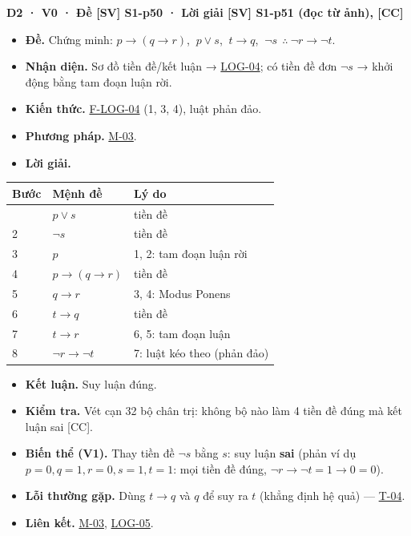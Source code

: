 \documentclass[
  10pt,
  twoside,openany]{book}
\providecommand{\tightlist}{%
  \setlength{\itemsep}{0pt}\setlength{\parskip}{0pt}}
\begin{document}
\textbf{D2 · V0 · Đề {[}SV{]} S1-p50 · Lời giải {[}SV{]} S1-p51 (đọc từ
ảnh), {[}CC{]}}

\begin{itemize}
\tightlist
\item
  \textbf{Đề.} Chứng minh: \(p\to(q\to r)\), \(\ p\vee s\),
  \(\ t\to q\), \(\ \neg s\ \ \therefore\ \neg r\to\neg t\).
\item
  \textbf{Nhận diện.} Sơ đồ tiền đề/kết luận →
  \protect\hyperlink{LOG-04}{LOG-04}; có tiền đề đơn \(\neg s\) → khởi
  động bằng tam đoạn luận rời.
\item
  \textbf{Kiến thức.} \protect\hyperlink{F-LOG-04}{F-LOG-04} (1, 3, 4),
  luật phản đảo.
\item
  \textbf{Phương pháp.} \protect\hyperlink{M-03}{M-03}.
\item
  \textbf{Lời giải.}
\end{itemize}

\begin{longtable}[]{@{}lll@{}}
\toprule\noalign{}
Bước & Mệnh đề & Lý do \\
\midrule\noalign{}
\endhead
\bottomrule\noalign{}
\endlastfoot
1 & \(p\vee s\) & tiền đề \\
2 & \(\neg s\) & tiền đề \\
3 & \(p\) & 1, 2: tam đoạn luận rời \\
4 & \(p\to(q\to r)\) & tiền đề \\
5 & \(q\to r\) & 3, 4: Modus Ponens \\
6 & \(t\to q\) & tiền đề \\
7 & \(t\to r\) & 6, 5: tam đoạn luận \\
8 & \(\neg r\to\neg t\) & 7: luật kéo theo (phản đảo) \\
\end{longtable}

\begin{itemize}
\tightlist
\item
  \textbf{Kết luận.} Suy luận đúng.
\item
  \textbf{Kiểm tra.} Vét cạn 32 bộ chân trị: không bộ nào làm 4 tiền đề
  đúng mà kết luận sai {[}CC{]}.
\item
  \textbf{Biến thể (V1).} Thay tiền đề \(\neg s\) bằng \(s\): suy luận
  \textbf{sai} (phản ví dụ \(p=0,q=1,r=0,s=1,t=1\): mọi tiền đề đúng,
  \(\neg r\to\neg t=1\to0=0\)).
\item
  \textbf{Lỗi thường gặp.} Dùng \(t\to q\) và \(q\) để suy ra \(t\)
  (khẳng định hệ quả) --- \protect\hyperlink{T-04}{T-04}.
\item
  \textbf{Liên kết.} \protect\hyperlink{M-03}{M-03},
  \protect\hyperlink{LOG-05}{LOG-05}.
\end{itemize}
\end{document}
